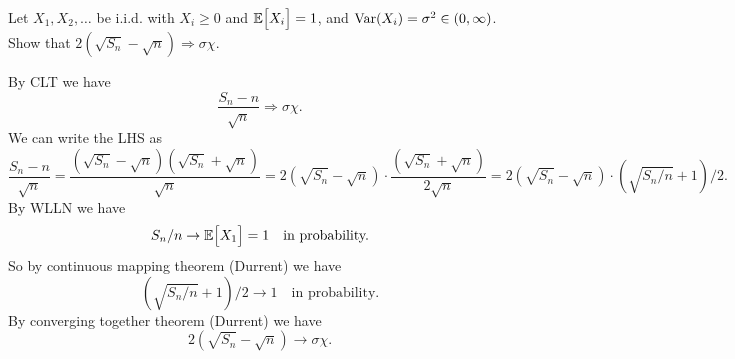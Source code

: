 \begin{problem}
	Let $ X_1,X_2,\dots $ be i.i.d. with $ X_i \geq 0 $ and $ \mathbb{E}\big[X_i\big] = 1 $, and $ \operatorname{Var}(X_i) = \sigma^2 \in (0,\infty) $. Show that $ 2(\sqrt{S_n} - \sqrt{n}) \Rightarrow \sigma \chi $.
\end{problem}
\begin{solution}
	By CLT we have
	\[ \frac{S_n - n}{\sqrt{n}} \Rightarrow \sigma \chi. \]
	We can write the LHS as 
	\[ \frac{S_n - n}{\sqrt{n}} = \frac{(\sqrt{S_n} - \sqrt{n})(\sqrt{S_n} + \sqrt{n})}{\sqrt{n}} = 2(\sqrt{S_n} - \sqrt{n}) \cdot \frac{(\sqrt{S_n} + \sqrt{n})}{2\sqrt{n}} = 2(\sqrt{S_n} - \sqrt{n}) \cdot (\sqrt{S_n/n} + 1)/2. \]
	By WLLN we have
	\[ S_n/n \to \mathbb{E}\big[X_1\big] =1 \quad \text{in probability.} \]
	So by continuous mapping theorem (Durrent) we have
	\[ (\sqrt{S_n/n} + 1)/2 \to 1 \quad \text{in probability}. \]
	By converging together theorem (Durrent) we have
	\[ 2(\sqrt{S_n} - \sqrt{n}) \to \sigma\chi. \]
\end{solution}



